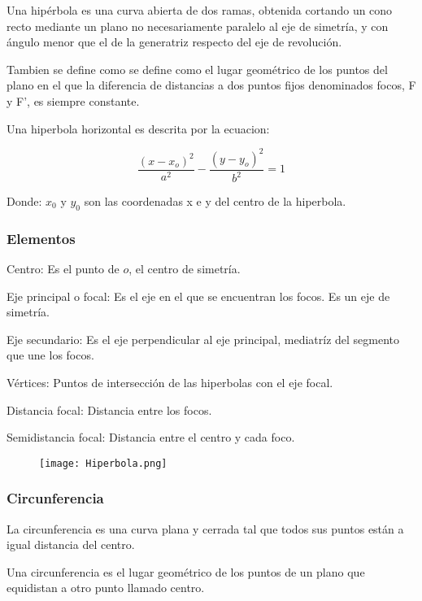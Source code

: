     Una hipérbola  es una curva abierta de dos ramas,
    obtenida cortando un cono recto mediante un plano no necesariamente
    paralelo al eje de simetría, y con ángulo menor que el de la generatriz
    respecto del eje de revolución.

    Tambien se define como se define como el lugar geométrico de los puntos del
    plano en el que la diferencia de distancias a dos puntos fijos denominados
    focos, F y F', es siempre constante.

    Una hiperbola horizontal es descrita por la ecuacion:

    $$ \frac{(x-x_o)^2}{a^2} - \frac{(y-y_o)^2}{b^2} = 1 $$

    Donde: $x_0$ y $y_0$ son las coordenadas x e y del centro de la hiperbola.

   \subsubsection*{Elementos} \label{Elementos}

    Centro: Es el punto de $o$, el centro de simetría.

    Eje principal o focal: Es el eje en el que se encuentran los focos. Es un
    eje de simetría.

    Eje secundario: Es el eje perpendicular al eje principal, mediatríz del
    segmento que une los focos.

    Vértices: Puntos de intersección de las hiperbolas con el eje focal.

    Distancia focal: Distancia entre los focos.

    Semidistancia focal: Distancia entre el centro y cada foco.


    \begin{figure}[htb]
 		\centering
		\texttt{[image: Hiperbola.png]}
        \vspace*{0.5cm}
	\end{figure}


    \subsubsection*{Circunferencia} \label{Circunferencia}

    La circunferencia es una curva plana y cerrada tal que todos sus puntos
    están a igual distancia del centro.

    Una circunferencia es el lugar geométrico de los puntos de un plano que
    equidistan a otro punto llamado centro.

